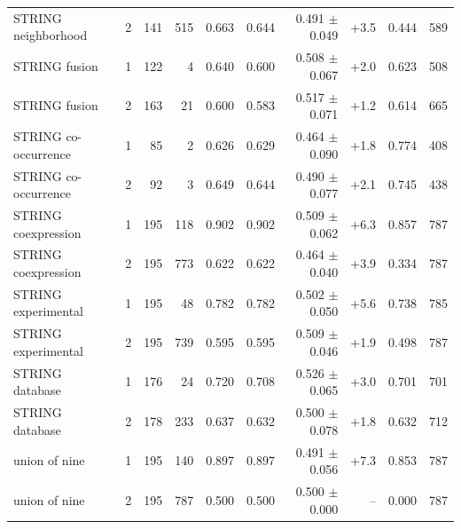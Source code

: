 \begin{table}[H]
\begin{tabular}{@{}lrrrrrrrrr@{}}
    STRING neighborhood & 2 & 141 & 515 & 0.663 & 0.644 & 0.491 $\pm$ 0.049 & +3.5 & 0.444 & 589 \\
    STRING fusion & 1 & 122 & 4 & 0.640 & 0.600 & 0.508 $\pm$ 0.067 & +2.0 & 0.623 & 508 \\
    STRING fusion & 2 & 163 & 21 & 0.600 & 0.583 & 0.517 $\pm$ 0.071 & +1.2 & 0.614 & 665 \\
    STRING co-occurrence & 1 & 85 & 2 & 0.626 & 0.629 & 0.464 $\pm$ 0.090 & +1.8 & 0.774 & 408 \\
    STRING co-occurrence & 2 & 92 & 3 & 0.649 & 0.644 & 0.490 $\pm$ 0.077 & +2.1 & 0.745 & 438 \\
    STRING coexpression & 1 & 195 & 118 & 0.902 & 0.902 & 0.509 $\pm$ 0.062 & +6.3 & 0.857 & 787 \\
    STRING coexpression & 2 & 195 & 773 & 0.622 & 0.622 & 0.464 $\pm$ 0.040 & +3.9 & 0.334 & 787 \\
    STRING experimental & 1 & 195 & 48 & 0.782 & 0.782 & 0.502 $\pm$ 0.050 & +5.6 & 0.738 & 785 \\
    STRING experimental & 2 & 195 & 739 & 0.595 & 0.595 & 0.509 $\pm$ 0.046 & +1.9 & 0.498 & 787 \\
    STRING database & 1 & 176 & 24 & 0.720 & 0.708 & 0.526 $\pm$ 0.065 & +3.0 & 0.701 & 701 \\
    STRING database & 2 & 178 & 233 & 0.637 & 0.632 & 0.500 $\pm$ 0.078 & +1.8 & 0.632 & 712 \\
    union of nine & 1 & 195 & 140 & 0.897 & 0.897 & 0.491 $\pm$ 0.056 & +7.3 & 0.853 & 787 \\
    union of nine & 2 & 195 & 787 & 0.500 & 0.500 & 0.500 $\pm$ 0.000 & -- & 0.000 & 787 \\
    \hline
  \end{tabular}
\end{table}
